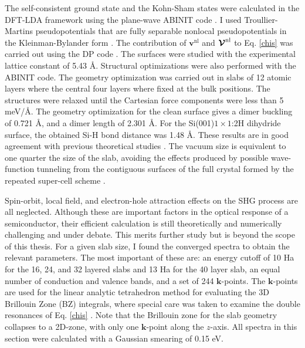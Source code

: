 \documentclass[11pt]{book}
\begin{document}
{The self-consistent ground state and the Kohn-Sham states were calculated in the
DFT-LDA framework using the plane-wave ABINIT code \cite{gonzeCPS09, abinit}. I
used Troullier-Martins pseudopotentials \cite{troullierPRB91} that are fully
separable nonlocal pseudopotentials in the Kleinman-Bylander
form \cite{kleinmanPRL82}. The contribution of $\mathbf{v}^\mathrm{nl}$ and
$\boldsymbol{\mathcal{\cal V}}^\mathrm{nl}$ to Eq. \eqref{chis} was carried out
using the DP code \cite{olevanoDP}. The surfaces were studied with the
experimental lattice constant of 5.43 \AA. Structural optimizations were also
performed with the ABINIT code. The geometry optimization was carried out in
slabs of 12 atomic layers where the central four layers where fixed at the bulk
positions. The structures were relaxed until the Cartesian force components were
less than 5 meV/\AA. The geometry optimization for the clean surface gives a
dimer buckling of 0.721 \AA, and a dimer length of 2.301 \AA. For the
Si(001)$1\times 1$:2H dihydride surface, the obtained Si-H bond distance was
1.48 \AA. These results are in good agreement with previous theoretical
studies \cite{caramellaPRB09,mendozaPRB06}. The vacuum size is equivalent to one
quarter the size of the slab, avoiding the effects produced by possible
wave-function tunneling from the contiguous surfaces of the full crystal formed
by the repeated super-cell scheme \cite{mendozaPRB06}.

Spin-orbit, local field, and electron-hole attraction \cite{beyond} effects on
the SHG process are all neglected. Although these are important factors in the
optical response of a semiconductor, their efficient calculation is still
theoretically and numerically challenging and under debate. This merits further
study but is beyond the scope of this thesis. For a given slab size, I found the
converged spectra to obtain the relevant parameters. The most important of these
are: an energy cutoff of 10 Ha for the 16, 24, and 32 layered slabs and 13 Ha
for the 40 layer slab, an equal number of conduction and valence bands, and a
set of 244 $\mathbf{k}$-points. The $\mathbf{k}$-points are used for the linear
analytic tetrahedron method for evaluating the 3D Brillouin Zone (BZ) integrals,
where special care was taken to examine the double resonances of Eq.
\eqref{chis} \cite{nastosPRB05}. Note that the Brillouin zone for the slab
geometry collapses to a 2D-zone, with only one $\mathbf{k}$-point along the
$z$-axis. All spectra in this section were calculated with a Gaussian smearing
of 0.15 eV.

}
\end{document}
